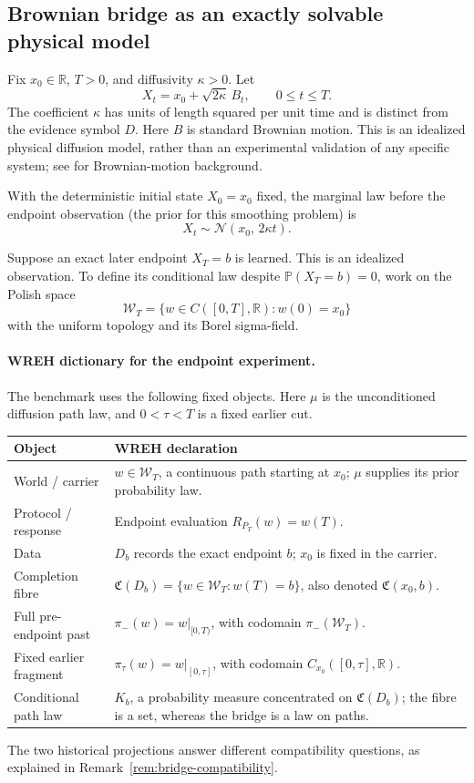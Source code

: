 \documentclass[11pt]{article}
\newcommand{\Wcal}{\mathcal W}
\newcommand{\Ccal}{\mathfrak C}
\begin{document}
\subsection{Brownian bridge as an exactly solvable physical model}

Fix $x_0\in\mathbb R$, $T>0$, and diffusivity $\kappa>0$. Let
\[
X_t=x_0+\sqrt{2\kappa}\,B_t,\qquad 0\le t\le T.
\]
The coefficient $\kappa$ has units of length squared per unit time
and is distinct from the evidence symbol $D$.
Here $B$ is standard Brownian motion. This is an idealized physical
diffusion model, rather than an experimental validation of any specific
system; see \cite{KaratzasShreve1998} for Brownian-motion background.

With the deterministic initial state $X_0=x_0$ fixed, the marginal
law before the endpoint observation (the prior for this smoothing
problem) is
\[
X_t\sim
\mathcal N(x_0,\,2\kappa t).
\]

Suppose an exact later endpoint $X_T=b$ is learned.
This is an idealized observation. To define its conditional law despite
$\mathbb P(X_T=b)=0$, work on the Polish space
\[
\Wcal_T=\{w\in C([0,T],\mathbb R):w(0)=x_0\}
\]
with the uniform topology and its Borel sigma-field.

\paragraph{WREH dictionary for the endpoint experiment.}
The benchmark uses the following fixed objects. Here $\mu$ is the
unconditioned diffusion path law, and $0<\tau<T$ is a fixed earlier cut.
\begin{center}
\begingroup
\renewcommand{\arraystretch}{1.12}
\begin{tabularx}{\linewidth}{@{}lX@{}}
\toprule
\textbf{Object} & \textbf{WREH declaration} \\
\midrule
World / carrier & $w\in\Wcal_T$, a continuous path starting at $x_0$;
  $\mu$ supplies its prior probability law. \\
Protocol / response & Endpoint evaluation $R_{P_T}(w)=w(T)$. \\
Data & $D_b$ records the exact endpoint $b$; $x_0$ is fixed in the carrier. \\
Completion fibre & $\Ccal(D_b)=\{w\in\Wcal_T:w(T)=b\}$,
  also denoted $\Ccal(x_0,b)$. \\
Full pre-endpoint past & $\pi_-(w)=w|_{[0,T)}$,
  with codomain $\pi_-(\Wcal_T)$. \\
Fixed earlier fragment & $\pi_\tau(w)=w|_{[0,\tau]}$,
  with codomain $C_{x_0}([0,\tau],\mathbb R)$. \\
Conditional path law & $K_b$, a probability measure concentrated on
  $\Ccal(D_b)$; the fibre is a set, whereas the bridge is a law on paths. \\
\bottomrule
\end{tabularx}
\endgroup
\end{center}
The two historical projections answer different compatibility questions,
as explained in Remark~\ref{rem:bridge-compatibility}.
\end{document}
